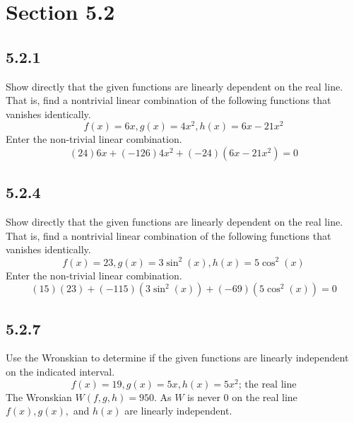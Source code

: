 \documentclass{article}
\begin{document}
\newcommand{\hr}{\par\noindent\rule{\textwidth}{0.4pt}}

\newcommand{\bc}[1]{
	\begin{equation*}
		\begin{boxed}
			{#1}
		\end{boxed}
	\end{equation*}
}

\newcommand{\cond}[2]{
	\ifmmode
		{#1} \quad {#2}
	\else
		$$ {#1} \quad {#2} $$
	\fi
}

\tableofcontents

\section{Section 5.2}

\subsection{5.2.1}
Show directly that the given functions are linearly dependent on the real line. That is, find a nontrivial linear combination of the following functions that vanishes identically.
$$ f(x) = 6x, g(x) = 4x^2, h(x) = 6x - 21x^2 $$
Enter the non-trivial linear combination.
$$ (24)6x + (-126)4x^2 + (-24)(6x - 21x^2) = 0 $$

\subsection{5.2.4}
Show directly that the given functions are linearly dependent on the real line. That is, find a nontrivial linear combination of the following functions that vanishes identically.
$$ f(x) = 23, g(x) = 3\sin^2(x), h(x) = 5\cos^2(x) $$
Enter the non-trivial linear combination.
$$ (15)(23) + (-115)(3\sin^2(x)) + (-69)(5\cos^2(x)) = 0 $$

\subsection{5.2.7}
Use the Wronskian to determine if the given functions are linearly independent on the indicated interval.
$$ f(x) = 19, g(x) = 5x, h(x) = 5x^2 \text{; the real line} $$
The Wronskian $ W(f,g,h) = 950 $. As $ W $ is never $ 0 $ on the real line $ f(x), g(x), $ and $ h(x) $ are linearly independent.
\end{document}
